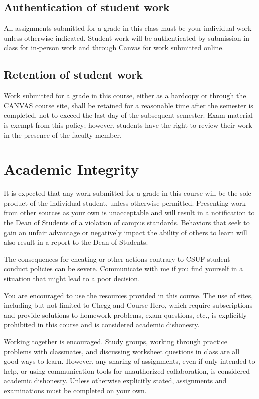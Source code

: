 \documentclass{syllabus}
\begin{document}
\subsection*{Authentication of student work}

All assignments submitted for a grade in this class must be your individual work unless otherwise indicated. Student work will be authenticated by submission in class for in-person work and through Canvas for work submitted online.

\subsection*{Retention of student work}

Work submitted for a grade in this course, either as a hardcopy or through the CANVAS course site, shall be retained for a reasonable time after the semester is completed, not to exceed the last day of the subsequent semester. Exam material is exempt from this policy; however, students have the right to review their work in the presence of the faculty member.

\section*{Academic Integrity}
It is expected that any work submitted for a grade in this course will be the sole product of the individual student, unless otherwise permitted. Presenting work from other sources as your own is unacceptable and will result in a notification to the Dean of Students of a violation of campus standards. Behaviors that seek to gain an unfair advantage or negatively impact the ability of others to learn will also result in a report to the Dean of Students.

The consequences for cheating or other actions contrary to CSUF student conduct policies can be severe. Communicate with me if you find yourself in a situation that might lead to a poor decision.

You are encouraged to use the resources provided in this course. The use of sites, including but not limited to Chegg and Course Hero, which require subscriptions and provide solutions to homework problems, exam questions, etc., is explicitly prohibited in this course and is considered academic dishonesty.

Working together is encouraged. Study groups, working through practice problems with classmates, and discussing worksheet questions in class are all good ways to learn. However, any sharing of assignments, even if only intended to help, or using communication tools for unauthorized collaboration, is considered academic dishonesty. Unless otherwise explicitly stated, assignments and examinations must be completed on your own.
\end{document}
